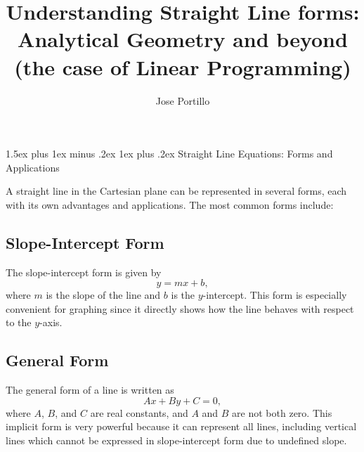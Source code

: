 \documentclass[10pt,twocolumn]{article}
\title{Understanding Straight Line forms: Analytical Geometry and beyond (the case of Linear Programming)}
\author{Jose Portillo}
\date{}
\makeatletter
\renewcommand\section{%
  \@startsection{section}{1}{0pt}%
  {1.5ex plus 1ex minus .2ex}%
  {1ex plus .2ex}%
  {\normalfont\normalsize\bfseries}} %
\renewcommand\section{%
  \@startsection{section}{1}{0pt}%
  {1.5ex plus 1ex minus .2ex}%
  {1ex plus .2ex}%
  {\normalfont\Large\bfseries}} %
\makeatother
\begin{document}

\section{Straight Line Equations: Forms and Applications}

A straight line in the Cartesian plane can be represented in several forms, each with its own advantages and applications. The most common forms include:

\subsection{Slope-Intercept Form}

The slope-intercept form is given by
\begin{equation}
y = mx + b,
\end{equation}
where \(m\) is the slope of the line and \(b\) is the \(y\)-intercept. This form is especially convenient for graphing since it directly shows how the line behaves with respect to the \(y\)-axis.

\subsection{General Form}

The general form of a line is written as
\begin{equation}
Ax + By + C = 0,
\end{equation}
where \(A\), \(B\), and \(C\) are real constants, and \(A\) and \(B\) are not both zero. This implicit form is very powerful because it can represent all lines, including vertical lines which cannot be expressed in slope-intercept form due to undefined slope.
\end{document}
